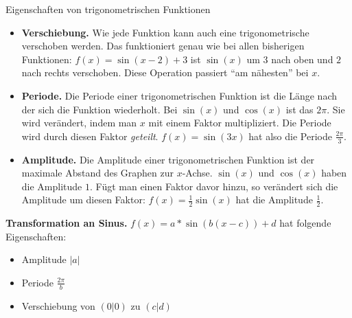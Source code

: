 \begin{bla}{Eigenschaften von trigonometrischen Funktionen}
  \begin{itemize}
    \item \textbf{Verschiebung.} Wie jede Funktion kann auch eine trigonometrische verschoben werden. Das funktioniert genau wie bei allen bisherigen Funktionen: $f(x)=\sin(x-2)+3$ ist $\sin(x)$ um $3$ nach oben und $2$ nach rechts verschoben. Diese Operation passiert "`am nähesten"' bei $x$.
    \item \textbf{Periode.} Die Periode einer trigonometrischen Funktion ist die Länge nach der sich die Funktion wiederholt. Bei $\sin(x)$ und $\cos(x)$ ist das $2\pi$. Sie wird verändert, indem man $x$ mit einem Faktor multipliziert. Die Periode wird durch diesen Faktor \emph{geteilt}. $f(x)=\sin(3x)$ hat also die Periode $\frac{2\pi}{3}$.
    \item \textbf{Amplitude.} Die Amplitude einer trigonometrischen Funktion ist der maximale Abstand des Graphen zur $x$-Achse. $\sin(x)$ und $\cos(x)$ haben die Amplitude $1$. Fügt man einen Faktor davor hinzu, so verändert sich die Amplitude um diesen Faktor: $f(x)=\frac{1}{2} \sin(x)$ hat die Amplitude $\frac{1}{2}$.
  \end{itemize}
\end{bla}

\begin{koch}
  \textbf{Transformation an Sinus.} $f(x)=a*\sin(b(x-c))+d$ hat folgende Eigenschaften:
  \begin{itemize}
    \item Amplitude $|a|$
    \item Periode $\frac{2\pi}{b}$
    \item Verschiebung von $(0|0)$ zu $(c|d)$
  \end{itemize}
\end{koch}

